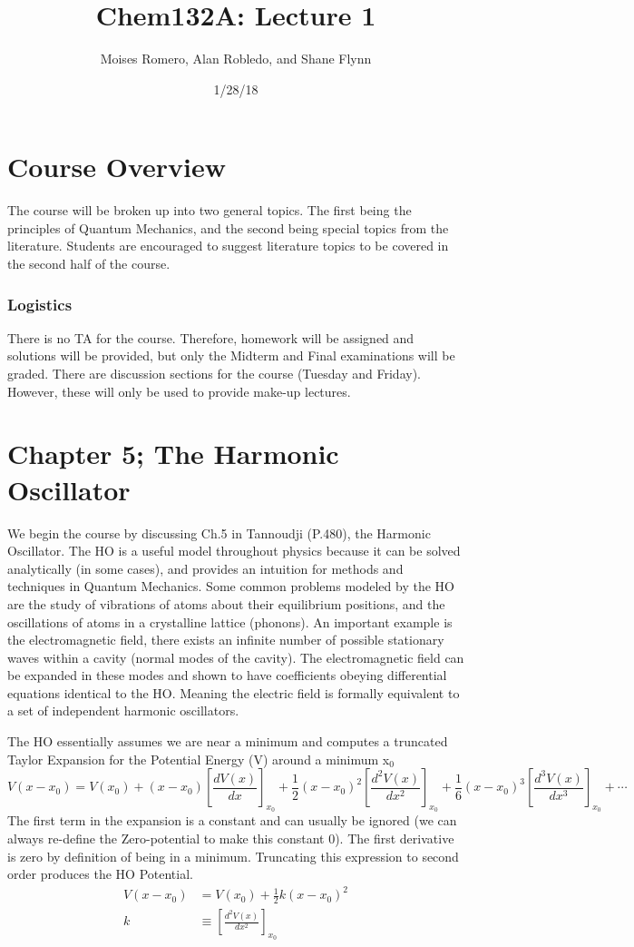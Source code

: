 \documentclass{article}
\title{Chem132A: Lecture 1}
\date{1/28/18}
\author{Moises Romero, Alan Robledo, and Shane Flynn}
\newcommand{\be}{\begin{equation}}
\newcommand{\ee}{\end{equation}}
\begin{document}
\maketitle

\section*{Course Overview}
The course will be broken up into two general topics.
The first being the principles of Quantum Mechanics, and the second being special topics from the literature.
Students are encouraged to suggest literature topics to be covered in the second half of the course.

\subsubsection*{Logistics}
There is no TA for the course. Therefore, homework will be assigned and solutions will be provided, but only the Midterm and Final examinations will be graded.
There are discussion sections for the course (Tuesday and Friday). However, these will only be used to provide make-up lectures.

\section*{Chapter 5; The Harmonic Oscillator}
We begin the course by discussing Ch.5 in Tannoudji (P.480), the Harmonic Oscillator.
The HO is a useful model throughout physics because it can be solved analytically (in some cases), and provides an intuition for methods and techniques in Quantum Mechanics.
Some common problems modeled by the HO are the study of vibrations of atoms about their equilibrium positions, and the oscillations of atoms in a crystalline lattice (phonons).
An important example is the electromagnetic field, there  exists an  infinite number of possible stationary waves within a cavity (normal modes of the cavity).
The electromagnetic field can be expanded in these modes and shown to have coefficients obeying differential equations identical to the HO.
Meaning the electric field is formally equivalent to a set of independent harmonic oscillators.

The HO essentially assumes we are near a minimum and computes a truncated Taylor Expansion for the Potential Energy (V) around a minimum x$_0$
\be
V(x - x_0) = V(x_0)  + (x-x_0) \left[\frac{dV(x)}{dx}\right]_{x_0} + \frac{1}{2}(x-x_0)^2  \left[\frac{d^2V(x)}{dx^2}\right]_{x_0} + \frac{1}{6} (x-x_0)^3  \left[\frac{d^3V(x)}{dx^3}\right]_{x_0} + \cdots
\ee
The first term in the expansion is a constant and can usually be ignored (we can always re-define the Zero-potential to make this constant 0).
The first derivative is zero by definition of being in a minimum.
Truncating this expression to second order produces the HO Potential.
\be
\begin{split}
    V(x-x_0) &= V(x_0) +  \frac{1}{2}k(x-x_0)^2\\
    k &\equiv \left[\frac{d^2V(x)}{dx^2}\right]_{x_0}
\end{split}
\ee
\end{document}
